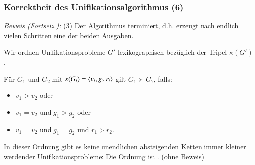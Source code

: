 \documentclass[onlymath]{beamer}
\begin{document}
\begin{frame}[t]\frametitle{Korrektheit des Unifikationsalgorithmus (6)}


\emph{Beweis (Fortsetz.):} (3) Der Algorithmus terminiert, d.h. erzeugt nach endlich vielen Schritten eine der beiden Ausgaben.
\smallskip

Wir ordnen Unifikationsprobleme $G'$ \alert{lexikographisch} bezüglich der Tripel $\kappa(G')$.\smallskip

Für $G_1$ und $G_2$ mit $\kappa(G_i)=\langle{v_i,g_i,r_i}\rangle$ gilt $G_1\succ G_2$, falls:
\begin{itemize}
\item $v_1>v_2$ oder
\item $v_1=v_2$ und $g_1>g_2$ oder
\item $v_1=v_2$ und $g_1=g_2$ und $r_1>r_2$.
\end{itemize}\pause

\pause

In dieser Ordnung gibt es keine unendlichen absteigenden Ketten immer kleiner werdender Unifikationsprobleme: Die Ordnung ist . (ohne Beweis)

\end{frame}
\end{document}
